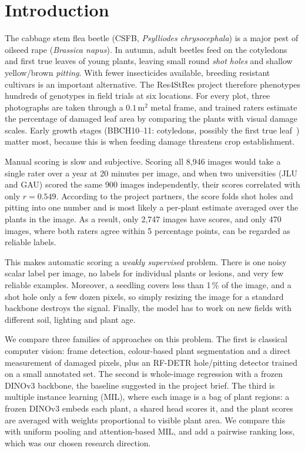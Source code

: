 \section{Introduction}
\label{sec:intro}

The cabbage stem flea beetle (CSFB, \emph{Psylliodes chrysocephala}) is a major pest of oilseed
rape (\emph{Brassica napus}). In autumn, adult beetles feed on the cotyledons and first true
leaves of young plants, leaving small round \emph{shot holes} and shallow yellow/brown
\emph{pitting}. With fewer insecticides available, breeding resistant cultivars is an important
alternative. The Res4StRes project therefore phenotypes hundreds of genotypes in field trials at
six locations. For every plot, three photographs are taken through a $0.1\,\text{m}^2$ metal
frame, and trained raters estimate the percentage of damaged leaf area by comparing the plants
with visual damage scales. Early growth stages (BBCH10--11: cotyledons, possibly the first true
leaf~\cite{bbch}) matter most, because this is when feeding damage threatens crop establishment.

Manual scoring is slow and subjective. Scoring all 8{,}946 images would take a single rater over a
year at 20 minutes per image, and when two universities (JLU and GAU) scored the same 900 images
independently, their scores correlated with only $r = 0.549$. According to the project partners,
the score folds shot holes and pitting into one number and is most likely a per-plant estimate
averaged over the plants in the image. As a result, only 2{,}747 images have scores, and only 470
images, where both raters agree within 5 percentage points, can be regarded as reliable labels.

This makes automatic scoring a \emph{weakly supervised} problem. There is one noisy scalar label
per image, no labels for individual plants or lesions, and very few reliable examples. Moreover,
a seedling covers less than 1\,\% of the image, and a shot hole only a few dozen pixels, so
simply resizing the image for a standard backbone destroys the signal. Finally, the model has to
work on new fields with different soil, lighting and plant age.

We compare three families of approaches on this problem. The first is classical computer vision:
frame detection, colour-based plant segmentation and a direct measurement of damaged pixels, plus
an RF-DETR hole/pitting detector trained on a small annotated set. The second is whole-image
regression with a frozen DINOv3 backbone, the baseline suggested in the project brief. The third
is multiple instance learning (MIL), where each image is a bag of plant regions: a frozen DINOv3
embeds each plant, a shared head scores it, and the plant scores are averaged with weights
proportional to visible plant area. We compare this with uniform pooling and attention-based MIL,
and add a pairwise ranking loss, which was our chosen research direction.

